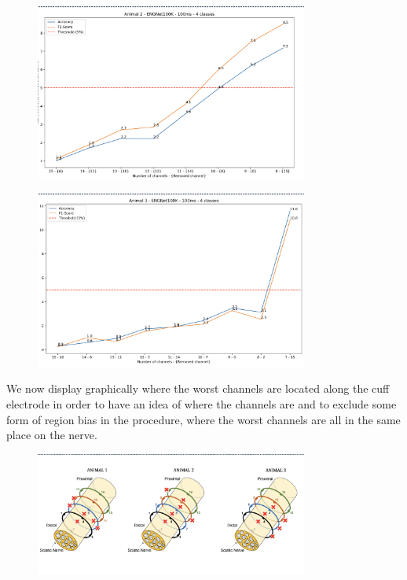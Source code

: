 \documentclass{Configuration_Files/PoliMi3i_thesis}
\begin{document}
\begin{figure}[H]
    \centering
    \includegraphics[width=0.8\textwidth]{Results Matteo/figure7}
    \label{fig:figure1}
\end{figure}

\begin{figure}[H]
    \centering
    \includegraphics[width=0.8\textwidth]{Results Matteo/figure8}
    \label{fig:figure1}
\end{figure}

We now display graphically where the worst channels are located along the cuff electrode in order to have an idea of where the channels are and to exclude some form of region bias in the procedure, where the worst channels are all in the same place on the nerve.

\begin{figure}[H]
    \centering
    \includegraphics[width=0.8\textwidth]{Results Matteo/figure9}
    \label{fig:figure1}
\end{figure}
\end{document}
